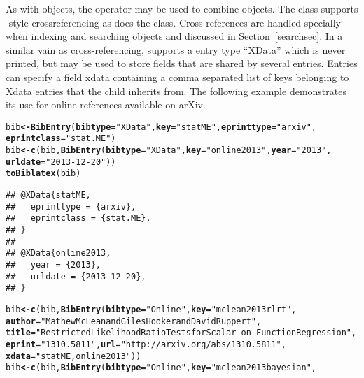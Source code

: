 \documentclass[article]{jss}\usepackage[]{graphicx}\usepackage[]{color}
\makeatletter
\newcommand{\hlstr}[1]{\textcolor[rgb]{0.125,0.125,1}{#1}}%
\newcommand{\hlstd}[1]{\textcolor[rgb]{0.251,0.251,0.282}{#1}}%
\newcommand{\hlkwb}[1]{\textcolor[rgb]{0.439,0.251,1}{\textbf{#1}}}%
\newcommand{\hlkwc}[1]{\textcolor[rgb]{0.529,0,0.184}{\textbf{#1}}}%
\newcommand{\hlkwd}[1]{\textcolor[rgb]{0.251,0.251,0.282}{\textbf{#1}}}%
\newenvironment{kframe}{%
 \def\at@end@of@kframe{}%
 \ifinner\ifhmode%
  \def\at@end@of@kframe{\end{minipage}}%
  \begin{minipage}{\columnwidth}%
 \fi\fi%
 \def\FrameCommand##1{\hskip\@totalleftmargin \hskip-\fboxsep
 \colorbox{shadecolor}{##1}\hskip-\fboxsep
     \hskip-\linewidth \hskip-\@totalleftmargin \hskip\columnwidth}%
 \MakeFramed {\advance\hsize-\width
   \@totalleftmargin\z@ \linewidth\hsize
   \@setminipage}}%
 {\par\unskip\endMakeFramed%
 \at@end@of@kframe}
\newenvironment{knitrout}{}{} %
\makeatother
\begin{document}
As with  objects, the operator  may be used to combine  objects.  The  class supports \Bibtex{}-style crossreferencing as does the  class.  Cross references are handled specially when indexing and searching  objects and discussed in Section~\ref{searchsec}.  In a similar vain as cross-referencing, \Biblatex{} supports a entry type ``XData'' which is never printed, but may be used to store fields that are shared by several entries.  Entries can specify a field xdata containing a comma separated list of keys belonging to Xdata entries that the child inherits from.  The following example demonstrates its use for online references available on arXiv.
\begin{knitrout}
\color{fgcolor}\begin{kframe}
\begin{alltt}
\hlstd{bib} \hlkwb{<-} \hlkwd{BibEntry}\hlstd{(}\hlkwc{bibtype}\hlstd{=}\hlstr{"XData"}\hlstd{,} \hlkwc{key} \hlstd{=} \hlstr{"statME"}\hlstd{,} \hlkwc{eprinttype} \hlstd{=} \hlstr{"arxiv"}\hlstd{,}
                \hlkwc{eprintclass} \hlstd{=} \hlstr{"stat.ME"}\hlstd{)}
\hlstd{bib} \hlkwb{<-} \hlkwd{c}\hlstd{(bib,} \hlkwd{BibEntry}\hlstd{(}\hlkwc{bibtype}\hlstd{=}\hlstr{"XData"}\hlstd{,} \hlkwc{key} \hlstd{=} \hlstr{"online2013"}\hlstd{,} \hlkwc{year} \hlstd{=} \hlstr{"2013"}\hlstd{,}
                       \hlkwc{urldate} \hlstd{=} \hlstr{"2013-12-20"}\hlstd{))}
\hlkwd{toBiblatex}\hlstd{(bib)}
\end{alltt}
\begin{verbatim}
## @XData{statME,
##   eprinttype = {arxiv},
##   eprintclass = {stat.ME},
## }
## 
## @XData{online2013,
##   year = {2013},
##   urldate = {2013-12-20},
## }
\end{verbatim}
\begin{alltt}
\hlstd{bib} \hlkwb{<-} \hlkwd{c}\hlstd{(bib,} \hlkwd{BibEntry}\hlstd{(}\hlkwc{bibtype}\hlstd{=}\hlstr{"Online"}\hlstd{,} \hlkwc{key}\hlstd{=}\hlstr{"mclean2013rlrt"}\hlstd{,}
  \hlkwc{author} \hlstd{=} \hlstr{"Mathew McLean and Giles Hooker and David Ruppert"}\hlstd{,}
  \hlkwc{title} \hlstd{=} \hlstr{"Restricted Likelihood Ratio Tests for Scalar-on-Function Regression"}\hlstd{,}
  \hlkwc{eprint} \hlstd{=} \hlstr{"1310.5811"}\hlstd{,} \hlkwc{url} \hlstd{=} \hlstr{"http://arxiv.org/abs/1310.5811"}\hlstd{,}
  \hlkwc{xdata} \hlstd{=} \hlstr{"statME,online2013"}\hlstd{))}
\hlstd{bib} \hlkwb{<-} \hlkwd{c}\hlstd{(bib,} \hlkwd{BibEntry}\hlstd{(}\hlkwc{bibtype}\hlstd{=}\hlstr{"Online"}\hlstd{,} \hlkwc{key}\hlstd{=}\hlstr{"mclean2013bayesian"}\hlstd{,}

\end{alltt}
\end{kframe}
\end{knitrout}
\end{document}
